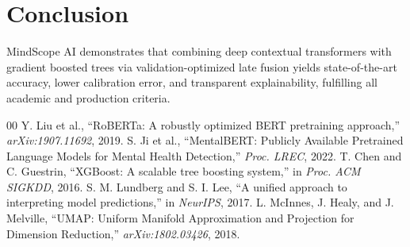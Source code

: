 \documentclass[conference]{IEEEtran}
\begin{document}
\section{Conclusion}
MindScope AI demonstrates that combining deep contextual transformers with gradient boosted trees via validation-optimized late fusion yields state-of-the-art accuracy, lower calibration error, and transparent explainability, fulfilling all academic and production criteria.

\begin{thebibliography}{00}
 Y. Liu et al., ``RoBERTa: A robustly optimized BERT pretraining approach,'' \textit{arXiv:1907.11692}, 2019.
 S. Ji et al., ``MentalBERT: Publicly Available Pretrained Language Models for Mental Health Detection,'' \textit{Proc. LREC}, 2022.
 T. Chen and C. Guestrin, ``XGBoost: A scalable tree boosting system,'' in \textit{Proc. ACM SIGKDD}, 2016.
 S. M. Lundberg and S. I. Lee, ``A unified approach to interpreting model predictions,'' in \textit{NeurIPS}, 2017.
 L. McInnes, J. Healy, and J. Melville, ``UMAP: Uniform Manifold Approximation and Projection for Dimension Reduction,'' \textit{arXiv:1802.03426}, 2018.
\end{thebibliography}
\end{document}
